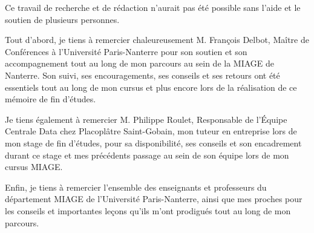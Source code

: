 Ce travail de recherche et de rédaction n'aurait pas été possible sans l'aide et le soutien de plusieurs personnes. \par

Tout d'abord, je tiens à remercier chaleureusement M. François Delbot, Maître de Conférences à l'Université Paris-Nanterre pour son soutien et son accompagnement tout au long de mon parcours au sein de la MIAGE de Nanterre. Son suivi, ses encouragements, ses conseils et ses retours ont été essentiels tout au long de mon cursus et plus encore lors de la réalisation de ce mémoire de fin d'études. \par

Je tiens également à remercier M. Philippe Roulet, Responsable de l'Équipe Centrale Data chez Placoplâtre Saint-Gobain, mon tuteur en entreprise lors de mon stage de fin d'études, pour sa disponibilité, ses conseils et son encadrement durant ce stage et mes précédents passage au sein de son équipe lors de mon cursus MIAGE. \par

Enfin, je tiens à remercier l'ensemble des enseignants et professeurs du département MIAGE de l'Université Paris-Nanterre, ainsi que mes proches pour les conseils et importantes leçons qu'ils m'ont prodigués tout au long de mon parcours.